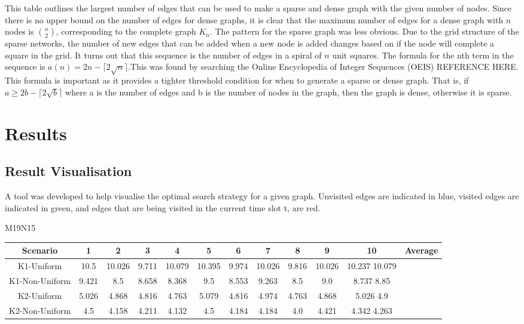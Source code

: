 \documentclass{article}
\begin{document}
    This table outlines the largest number of edges that can be used to make a sparse and dense graph with the given number of nodes. Since there is no upper bound on the number of edges for dense graphs, it is clear that the maximum number of edges for a dense graph with $n$ nodes is $\binom{n}{2}$, corresponding to the complete graph $K_n$. The pattern for the sparse graph was less obvious. Due to the grid structure of the sparse networks, the number of new edges that can be added when a new node is added changes based on if the node will complete a square in the grid. It turns out that this sequence is the number of edges in a spiral of $n$ unit squares. The formula for the nth term in the sequence is $a(n) = 2n - \lceil 2\sqrt{n} \rceil$.This was found by searching the Online Encyclopedia of Integer Sequences (OEIS) REFERENCE HERE. This formula is important as it provides a tighter threshold condition for when to generate a sparse or dense graph. That is, if $a \geq 2b - \lceil 2\sqrt{b} \rceil$ where a is the number of edges and b is the number of nodes in the graph, then the graph is dense, otherwise it is sparse.
\section{Results}
\subsection{Result Visualisation}
A tool was developed to help visualise the optimal search strategy for a given graph. Unvisited edges are indicated in blue, visited edges are indicated in green, and edges that are being visited in the current time slot t, are red.
\begin{table}
M19N15\\
\begin{tabular}{ |c|c|c|c|c|c|c|c|c|c|c|c|  }
\hline
Scenario & 1 & 2 & 3 & 4 & 5 & 6 & 7 & 8 & 9 & 10 & Average\\
\hline
K1-Uniform & 10.5 & 10.026 & 9.711 & 10.079 & 10.395 & 9.974 & 10.026 & 9.816 & 10.026 & 10.237 10.079\\ \hline
K1-Non-Uniform & 9.421 & 8.5 & 8.658 & 8.368 & 9.5 & 8.553 & 9.263 & 8.5 & 9.0 & 8.737 8.85\\ \hline
K2-Uniform & 5.026 & 4.868 & 4.816 & 4.763 & 5.079 & 4.816 & 4.974 & 4.763 & 4.868 & 5.026 4.9\\ \hline
K2-Non-Uniform & 4.5 & 4.158 & 4.211 & 4.132 & 4.5 & 4.184 & 4.184 & 4.0 & 4.421 & 4.342 4.263\\ \hline
\end{tabular}
\end{table}
\end{document}

